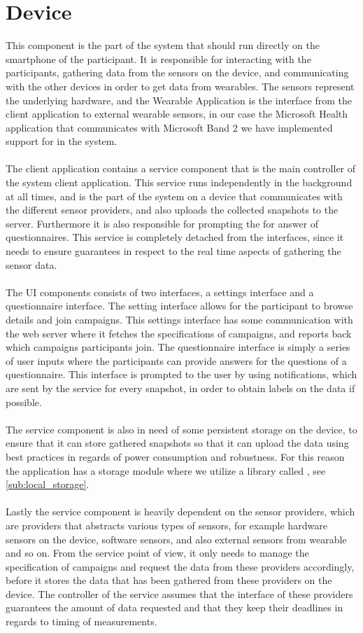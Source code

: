 \section{Device}
\label{sec:device}
This component is the part of the system that should run directly on the smartphone of the participant. It is responsible for interacting with the participants, gathering data from the sensors on the device, and communicating with the other devices in order to get data from wearables. The sensors represent the underlying hardware, and the Wearable Application is the interface from the client application to external wearable sensors, in our case the Microsoft Health application that communicates with Microsoft Band 2 we have implemented support for in the system.
\\\\
The client application contains a service component that is the main controller of the system client application. This service runs independently in the background at all times, and is the part of the system on a device that communicates with the different sensor providers, and also uploads the collected snapshots to the server. Furthermore it is also responsible for prompting the for answer of questionnaires. This service is completely detached from the interfaces, since it needs to ensure guarantees in respect to the real time aspects of gathering the sensor data.
\\\\
The UI components consists of two interfaces, a settings interface and a questionnaire interface. The setting interface allows for the participant to browse details and join campaigns. This settings interface has some communication with the web server where it fetches the specifications of campaigns, and reports back which campaigns participants join. The questionnaire interface is simply a series of user inputs where the participants can provide answers for the questions of a questionnaire. This interface is prompted to the user by using notifications, which are sent by the service for every snapshot, in order to obtain labels on the data if possible.
\\\\
The service component is also in need of some persistent storage on the device, to ensure that it can store gathered snapshots so that it can upload the data using best practices in regards of power consumption and robustness. For this reason the application has a storage module where we utilize a library called , see \ref{sub:local_storage}.
\\\\
Lastly the service component is heavily dependent on the sensor providers, which are providers that abstracts various types of sensors, for example hardware sensors on the device, software sensors, and also external sensors from wearable and so on. From the service point of view, it only needs to manage the specification of campaigns and request the data from these providers accordingly, before it stores the data that has been gathered from these providers on the device. The controller of the service assumes that the interface of these providers guarantees the amount of data requested and that they keep their deadlines in regards to timing of measurements.